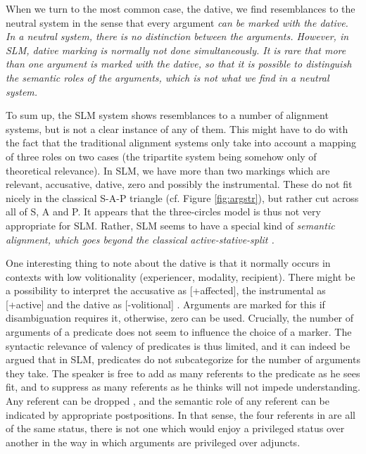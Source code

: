 When we turn to the most common case, the dative, we find resemblances to the neutral system in the sense that every argument \em can \em be marked with the dative. In a neutral system, there is no distinction between the arguments. However, in SLM, dative marking is normally not done simultaneously. It is rare that more than one argument is marked with the dative, so that it is possible to distinguish the semantic roles of the arguments, which is not what we find in a neutral system.

To sum up, the SLM system shows resemblances to a number of alignment systems, but is not a clear instance of any of them. This might have to do with the fact that the traditional alignment systems only take into account a mapping of  three roles on two cases (the tripartite system being somehow only of theoretical relevance). In SLM, we have more than two markings which are relevant, accusative, dative, zero and possibly the instrumental. These do not fit nicely in the classical S-A-P triangle (cf. Figure \ref{fig:argstr}), but rather cut across all of S, A and P. It appears that the three-circles model is thus not very appropriate for SLM. Rather, SLM seems to have a special kind of \em semantic alignment\em, which goes beyond the classical active-stative-split \citep{Klimov1974}.

One interesting thing to note about the dative is that it normally occurs in contexts with low volitionality (experiencer, modality, recipient). There might be a possibility to interpret the accusative as [+affected], the instrumental as [+active] and the dative as [-volitional] \citep{Ansaldo2005ms}. Arguments are marked for this if disambiguation requires it, otherwise, zero can be used. Crucially, the number of arguments of a predicate does not seem to influence the choice of a marker. The syntactic relevance of valency of predicates is thus limited, and it can indeed be argued that in SLM, predicates do not subcategorize for the number of arguments they take. The speaker is free to add as many referents to the predicate as he sees fit, and to suppress as many referents as he thinks will not impede understanding. Any referent can be dropped , and the semantic role of any referent can be indicated by appropriate postpositions. In that sense, the four referents in  are all of the same status, there is not one which would enjoy a privileged status over another in the way in which arguments are privileged over adjuncts.




